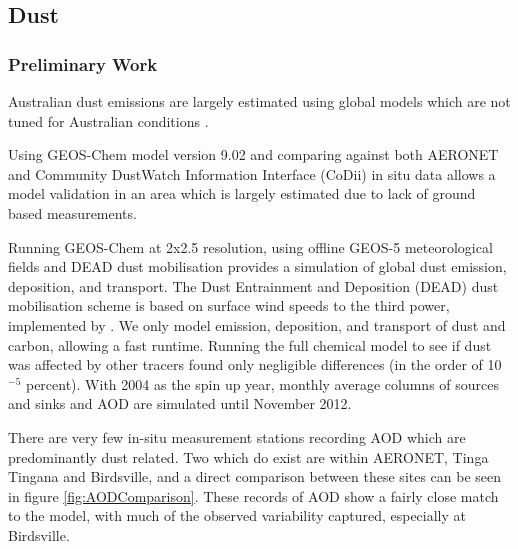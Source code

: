 \subsection{Dust}
\subsubsection{Preliminary Work}
Australian dust emissions are largely estimated using global models which are not tuned for Australian conditions \cite{Ridley_2013,Duncan_Fairlie_2007}.

Using GEOS-Chem model version 9.02 and comparing against both AERONET and Community DustWatch Information Interface (CoDii) in situ data allows a model validation in an area which is largely estimated due to lack of ground based measurements.

Running GEOS-Chem at 2x2.5 resolution, using offline GEOS-5 meteorological fields and DEAD dust mobilisation provides a simulation of global dust emission, deposition, and transport.
The Dust Entrainment and Deposition (DEAD) dust mobilisation scheme is based on surface wind speeds to the third power, implemented by \citet{Duncan_Fairlie_2007}.
We only model emission, deposition, and transport of dust and carbon, allowing a fast runtime.
Running the full chemical model to see if dust was affected by other tracers found only negligible differences (in the order of 10$^{-5}$ percent).
With 2004 as the spin up year, monthly average columns of sources and sinks and AOD are simulated until November 2012.

There are very few in-situ measurement stations recording AOD which are predominantly dust related.
Two which do exist are within AERONET, Tinga Tingana and Birdsville, and a direct comparison between these sites can be seen in figure \ref{fig:AODComparison}.
These records of AOD show a fairly close match to the model, with much of the observed variability captured, especially at Birdsville.
